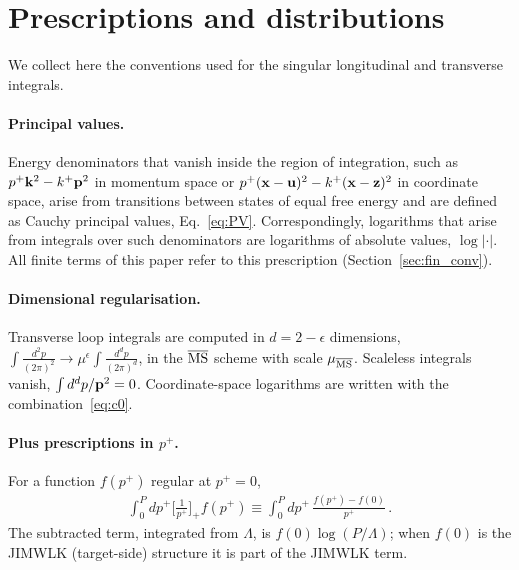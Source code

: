 \section{Prescriptions and distributions}\label{app:distributions}

We collect here the conventions used for the singular longitudinal and transverse integrals.

\paragraph{Principal values.} Energy denominators that vanish inside the region of integration, such as $p^+\mathbf{k}^2-k^+\mathbf{p}^2$ in momentum space or $p^+(\mathbf{x}-\mathbf{u})^2-k^+(\mathbf{x}-\mathbf{z})^2$ in coordinate space, arise from transitions between states of equal free energy and are defined as Cauchy principal values, Eq.~\eqref{eq:PV}. Correspondingly, logarithms that arise from integrals over such denominators are logarithms of absolute values, $\log|\cdot|$. All finite terms of this paper refer to this prescription (Section~\ref{sec:fin_conv}).

\paragraph{Dimensional regularisation.} Transverse loop integrals are computed in $d=2-\epsilon$ dimensions, $\int\frac{d^2p}{(2\pi)^2}\to\mu^{\epsilon}\int\frac{d^dp}{(2\pi)^d}$, in the $\overline{\rm MS}$ scheme with scale $\mu_{\overline{\rm MS}}$. Scaleless integrals vanish, $\int d^dp/\mathbf{p}^2=0$. Coordinate-space logarithms are written with the combination~\eqref{eq:c0}.

\paragraph{Plus prescriptions in $p^+$.} For a function $f(p^+)$ regular at $p^+=0$,
\begin{align}\label{eq:plusp}
\int_0^{P}dp^+\Big[\frac{1}{p^+}\Big]_+f(p^+)\equiv\int_0^{P}dp^+\,\frac{f(p^+)-f(0)}{p^+}\,.
\end{align}
The subtracted term, integrated from $\Lambda$, is $f(0)\log(P/\Lambda)$; when $f(0)$ is the JIMWLK (target-side) structure it is part of the JIMWLK term.

